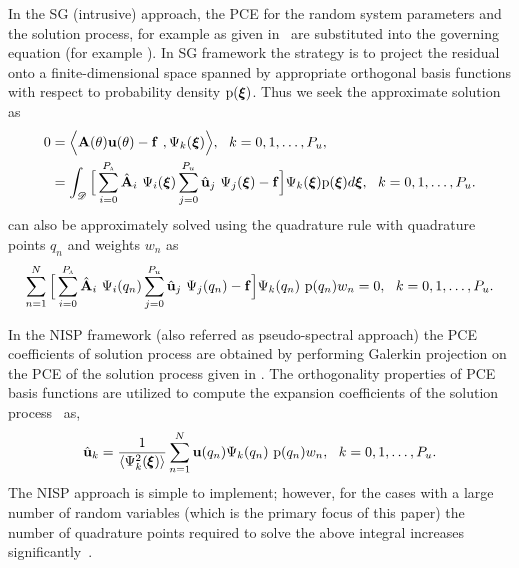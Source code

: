 \documentclass[letter,1p,11pt,oneside,onecolumn,sort&compress]{elsarticle}
\begin{document}
In the SG (intrusive) approach, the PCE for the random system parameters and the solution process, for example as given in~ are substituted into the governing equation (for example ).
In SG framework the strategy is to project the residual onto a finite-dimensional space spanned by appropriate orthogonal basis functions with respect to probability density $\mathrm{p}(\mbox{\boldmath $\xi$})$. Thus we seek the approximate solution as~\cite{smith2013uncertainty}
\begin{align}\label{eq:sg_int}
 0 &= \Big\langle  {\mathrm{\bf{A}(\theta) \bf{u}(\theta) - \bf{f}}} \ , \Psi_k(\mbox{\boldmath $\xi$}) \Big\rangle, \ \ k=0,1,\dots,P_u,  \\ \nonumber
  &= \int_{\mathscr{D}} \Big[ \sum^{P_{\textsc{a}}}_{i=0} {\hat{{\mathrm{\bf{A}}}}_i} \ {\Psi_i(\mbox{\boldmath $\xi$})}   \sum^{P_{u}}_{j=0} {\mathrm{\hat{\bf{u}}}_j}  \ {\Psi_j(\mbox{\boldmath $\xi$})} - {\bf{f}} \Big] \Psi_k(\mbox{\boldmath $\xi$}) \mathrm{p}(\mbox{\boldmath $\xi$}) d\mbox{\boldmath $\xi$}, \ \ k=0,1,\dots,P_u.
\end{align}
 can also be approximately solved using the quadrature rule with quadrature points $q_n$ and weights $w_n$ as
\begin{align} \label{eq:sg_int2}
  \sum_{n=1}^{N} \Big[ \sum^{P_{\textsc{a}}}_{i=0} {\hat{{\mathrm{\bf{A}}}}_i} \ {\Psi_i(q_n)}   \sum^{P_{u}}_{j=0} {\mathrm{\hat{\bf{u}}}_j}  \ {\Psi_j(q_n)} - {\bf{f}} \Big] \Psi_k(q_n) \ \mathrm{p}(q_n) w_n = 0, \ \ k=0,1,\dots,P_u.
\end{align}

In the NISP framework (also referred as pseudo-spectral approach) the PCE  coefficients of solution process are obtained by performing Galerkin projection on the PCE of the solution process given in . The orthogonality properties of PCE basis functions are utilized to compute the expansion coefficients of the solution process~\cite{ghanemSFEM1991,le2010spectral} as,
\begin{equation}
{\mathrm{\hat{\bf{u}}}_k} = \frac{1} {\left<{\Psi_k^2({\pmb{\xi}})}  \right>} \sum_{n=1}^{N} {\mathrm{\bf{u}}(q_n)} \Psi_k(q_n) \ \mathrm{p}(q_n) w_n, \ \ k=0,1,\dots,P_u.
\label{eq:NISPpce_framework}
\end{equation}
The NISP approach is simple to implement; however, for the cases with a large number of random variables (which is the primary focus of this paper) the number of quadrature points required to solve the above integral increases significantly~\cite{smith2013uncertainty,hosder2006non,eldred2009comparison,eldred2009recent}.
\end{document}
